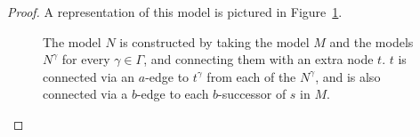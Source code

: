 \begin{proof}
A representation of this model is pictured in Figure~\ref{k-diagram}.

\begin{figure}\label{k-diagram}
\begin{center}
\caption{
The model $N$ is constructed by taking the model $M$ and the models $N^\gamma$
for every $\gamma \in \Gamma$, and connecting them with an extra node $t$. $t$
is connected via an $a$-edge to $t^\gamma$ from each of the $N^\gamma$, and is
also connected via a $b$-edge to each $b$-successor of $s$ in $M$.
}
\end{center}
\end{figure}


\end{proof}
